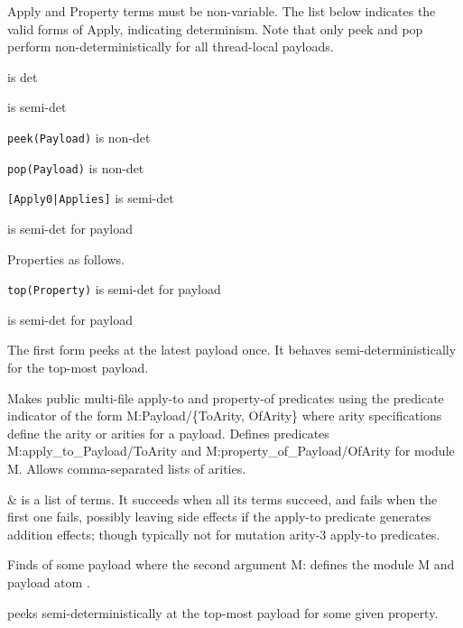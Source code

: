 Apply and Property terms must be non-variable. The list below
indicates the valid forms of Apply, indicating determinism. Note that
only peek and pop perform non-deterministically for all thread-local
payloads.

\begin{shortlist}
    \item {} is det
    \item {} is semi-det
    \item \verb$peek(Payload)$ is non-det
    \item \verb$pop(Payload)$ is non-det
    \item \verb$[Apply0|Applies]$ is semi-det
    \item {} is semi-det for payload
\end{shortlist}

Properties as follows.

\begin{shortlist}
    \item \verb$top(Property)$ is semi-det for payload
    \item {} is semi-det for payload
\end{shortlist}

The first form  peeks at the latest payload once. It behaves
semi-deterministically for the top-most payload.\vspace{0.7cm}

\begin{description}
Makes public multi-file apply-to and property-of predicates using
the predicate indicator  of the form M:Payload/\{ToArity, OfArity\}
where arity specifications define the arity or arities for a
payload. Defines predicates M:apply_to_Payload/ToArity and
M:property_of_Payload/OfArity for module M. Allows comma-separated
lists of arities.

\nodescription

\begin{arguments}
 & is a list of  terms. It succeeds when all its
 terms succeed, and fails when the first one fails, possibly
leaving side effects if the apply-to predicate generates addition
effects; though typically not for mutation arity-3 apply-to
predicates. \\
\end{arguments}

Finds  of some payload where the second argument M:
defines the module M and payload atom .

  peeks semi-deterministically at the top-most payload
for some given property.
\end{description}

